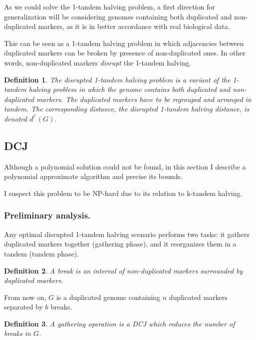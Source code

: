 \documentclass[11pt,final,twoside,nofrench]{thlifl}
\newtheorem{definition}{Definition}
\begin{document}
As we could solve the 1-tandem halving problem, a first direction for generalization will be considering genomes containing both duplicated and non-duplicated markers, as it is in better accordance with real biological data.

This can be seen as a 1-tandem halving problem in which adjacencies between duplicated markers can be broken by presence of non-duplicated ones. In other words, non-duplicated markers \emph{disrupt} the 1-tandem halving.

\begin{definition}
The \emph{disrupted 1-tandem halving problem} is a variant of the 1-tandem halving problem in which the genome contains both duplicated and non-duplicated markers. The duplicated markers have to be regrouped and arranged in tandem. The corresponding distance, the \emph{disrupted 1-tandem halving distance}, is denoted $d^{t'}(G)$.
\end{definition}

\subsection{DCJ}

Although a polynomial solution could not be found, in this section I describe a polynomial approximate algorithm and precise its bounds.

I suspect this problem to be NP-hard due to its relation to k-tandem halving.

\subsubsection{Preliminary analysis.}

Any optimal disrupted 1-tandem halving scenario performs two tasks: it gathers duplicated markers together (gathering phase), and it reorganizes them in a tandem (tandem phase).

\begin{definition}
A \emph{break} is an interval of non-duplicated markers surrounded by duplicated markers.
\end{definition}

From now on, $G$ is a duplicated genome containing $n$ duplicated markers separated by $b$ breaks.

\begin{definition}
A \emph{gathering operation} is a DCJ which reduces the number of breaks in $G$.
\end{definition}
\end{document}
